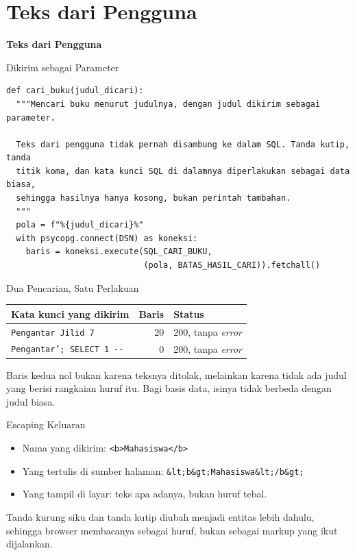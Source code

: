 \documentclass[aspectratio=169, table, 12pt]{beamer}
\begin{document}
\section{Teks dari Pengguna}

\begin{frame}{\hfill}
  \centering
  \Huge{\textbf{Teks dari Pengguna}}
\end{frame}

\begin{frame}[fragile]{{\Large Dikirim sebagai Parameter}}
  \vspace{2pt}
\begin{lstlisting}[style=PythonStyle]
def cari_buku(judul_dicari):
  """Mencari buku menurut judulnya, dengan judul dikirim sebagai parameter.

  Teks dari pengguna tidak pernah disambung ke dalam SQL. Tanda kutip, tanda
  titik koma, dan kata kunci SQL di dalamnya diperlakukan sebagai data biasa,
  sehingga hasilnya hanya kosong, bukan perintah tambahan.
  """
  pola = f"%{judul_dicari}%"
  with psycopg.connect(DSN) as koneksi:
    baris = koneksi.execute(SQL_CARI_BUKU,
                            (pola, BATAS_HASIL_CARI)).fetchall()
\end{lstlisting}
\end{frame}

\begin{frame}{{\Large Dua Pencarian, Satu Perlakuan}}
  \vspace{6pt}
  \centering
  {\footnotesize
  \begin{tabularx}{\textwidth}{Yrl}
    \hline
    \textbf{Kata kunci yang dikirim} & \textbf{Baris} & \textbf{Status} \\
    \hline
    \texttt{Pengantar Jilid 7} & 20 & 200, tanpa \textit{error} \\
    \hline
    \texttt{Pengantar'; SELECT 1 -{}-} & 0 & 200, tanpa \textit{error} \\
    \hline
  \end{tabularx}}

  \vspace{8pt}
  {\small Baris kedua nol bukan karena teksnya ditolak, melainkan karena
  tidak ada judul yang berisi rangkaian huruf itu. Bagi basis data, isinya
  tidak berbeda dengan judul biasa.}
\end{frame}

\begin{frame}{{\Large Escaping Keluaran}}
  \vspace{14pt}
  \begin{itemize}
    \item Nama yang dikirim: \texttt{<b>Mahasiswa</b>}
    \item Yang tertulis di sumber halaman:
          \texttt{\&lt;b\&gt;Mahasiswa\&lt;/b\&gt;}
    \item Yang tampil di layar: teks apa adanya, bukan huruf tebal.
  \end{itemize}
  \vspace{10pt}
  {\small Tanda kurung siku dan tanda kutip diubah menjadi entitas lebih
  dahulu, sehingga browser membacanya sebagai huruf, bukan sebagai markup
  yang ikut dijalankan.}
\end{frame}
\end{document}

